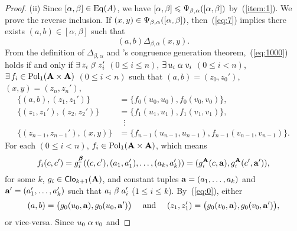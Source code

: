 \begin{proof}
  \noindent (ii)
  Since $[\alpha, \beta] \in \operatorname{Eq}(A)$,
  we have $[\alpha, \beta] \leqslant \Psi_{\beta, \alpha}([\alpha, \beta])$
  by~(\ref{item:1}).
  We prove the reverse inclusion.
  If $(x,y)\in \Psi_{\beta, \alpha}([\alpha, \beta])$, then~(\ref{eq:7})
  implies there exists $(a,b)\in [\alpha, \beta]$ such that
    \begin{equation}
      \label{eq:1000}
     (a,b) \mathrel{\Delta_{\beta, \alpha}} (x,y).
    \end{equation}
    From the definition of $\Delta_{\beta, \alpha}$ and 
    \malcev's congruence generation theorem,~(\ref{eq:1000})
    holds if and only if
    $\exists \, z_i \mathrel{\beta} z_i'$ $(0\leq i \leq n)$,
    $\exists \, u_i \mathrel{\alpha} v_i$ $(0\leq i < n)$,
    $\exists\, f_i \in \operatorname{Pol}_1(\mathbf{A}\times \mathbf{A})$ $(0\leq i < n)$
    such that
    $(a, b) = (z_0,z_0')$,
    $(x, y)=(z_n,z_n')$,
    \begin{align}
      \label{eq:0}
      \{(a, b),(z_1,z_1')\} &= \{f_0(u_0,u_0), f_0(v_0,v_0)\},\\
      \label{eq:1}
      \{(z_1,z_1'),(z_2,z_2')\} &= \{f_1(u_1,u_1), f_1(v_1,v_1)\},\\
      \nonumber
      &\; \; \vdots\\
      \nonumber
      \{(z_{n-1},z_{n-1}'),(x, y)\} &= \{f_{n-1}(u_{n-1},u_{n-1}), f_{n-1}(v_{n-1},v_{n-1})\}.
    \end{align}
    For each $(0\leq i < n)$, $f_i \in \operatorname{Pol}_1(\mathbf{A}\times \mathbf{A})$, which means
    \newcommand\gA{\ensuremath{g^{\bA}}}%
    \[      f_i(c, c') = g_i^{\bbeta}((c, c'), (a_1, a_1'), \dots, (a_k, a_k') )
      = (g_i^{\bA}(c, \ba), g_i^{\bA}(c', \ba')),%
      \]%
    \renewcommand\gA{\ensuremath{g}}%
    for some $k$, $\gA_i \in \sansClo_{k+1}(\bA)$, and constant tuples
    $\mathbf{a} = (a_1, \dots, a_k)$ and $\mathbf{a}' = (a_1', \dots, a_k')$ such that
    $a_i \mathrel{\beta} a_i'$ ($1\leq i\leq k$). 
    By~(\ref{eq:0}), either
    \[
    (a, b) = \bigl(\gA_0(u_0, \ba), \gA_0(u_0, \ba')\bigr)
    \quad \text{ and } \quad 
    (z_1,z_1')= \bigl(\gA_0(v_0, \ba), \gA_0(v_0, \ba')\bigr),
    \]
    or vice-versa.  Since $u_0 \mathrel{\alpha} v_0$ and 

\end{proof}
